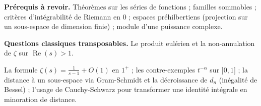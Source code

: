 \documentclass[11pt,a4paper]{article}
\begin{document}
\textbf{Prérequis à revoir.} Théorèmes sur les séries de fonctions ; familles sommables ; critères d'intégrabilité de Riemann en \(0\) ; espaces préhilbertiens (projection sur un sous-espace de dimension finie) ; module d'une puissance complexe.

\textbf{Questions classiques transposables.} Le produit eulérien et la non-annulation de \(\zeta\) sur \(\operatorname{Re}(s)>1\).

La formule \(\zeta(s)=\frac1{s-1}+O(1)\) en \(1^+\) ; les contre-exemples \(t^{-\alpha}\) sur \(]0,1]\) ; la distance à un sous-espace via Gram-Schmidt et la décroissance de \(d_n\) (inégalité de Bessel) ; l'usage de Cauchy-Schwarz pour transformer une identité intégrale en minoration de distance.
\end{document}

